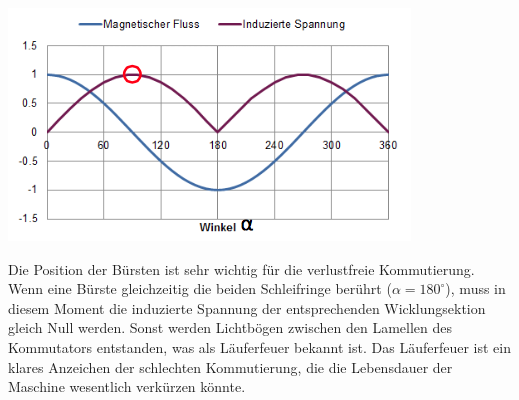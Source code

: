 \begin{minipage}{0.4 \linewidth}
\includegraphics[width = \linewidth]{./Pics/VL45/GSM3}
\end{minipage}
\begin{minipage}{0.6\linewidth}
Die Position der Bürsten ist sehr wichtig für die verlustfreie Kommutierung. Wenn eine Bürste gleichzeitig die beiden Schleifringe berührt ($\alpha = 180^\circ$), muss in diesem Moment die induzierte Spannung der entsprechenden Wicklungsektion gleich Null werden. Sonst werden Lichtbögen zwischen den Lamellen des Kommutators entstanden, was als Läuferfeuer bekannt ist. Das Läuferfeuer ist ein klares Anzeichen der schlechten Kommutierung, die die Lebensdauer der Maschine wesentlich verkürzen könnte.
\end{minipage}

